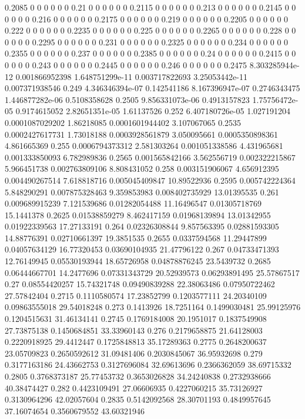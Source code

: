 {0.2085 0 0 0 0 0 0
0.21 0 0 0 0 0 0
0.2115 0 0 0 0 0 0
0.213 0 0 0 0 0 0
0.2145 0 0 0 0 0 0
0.216 0 0 0 0 0 0
0.2175 0 0 0 0 0 0
0.219 0 0 0 0 0 0
0.2205 0 0 0 0 0 0
0.222 0 0 0 0 0 0
0.2235 0 0 0 0 0 0
0.225 0 0 0 0 0 0
0.2265 0 0 0 0 0 0
0.228 0 0 0 0 0 0
0.2295 0 0 0 0 0 0
0.231 0 0 0 0 0 0
0.2325 0 0 0 0 0 0
0.234 0 0 0 0 0 0
0.2355 0 0 0 0 0 0
0.237 0 0 0 0 0 0
0.2385 0 0 0 0 0 0
0.24 0 0 0 0 0 0
0.2415 0 0 0 0 0 0
0.243 0 0 0 0 0 0
0.2445 0 0 0 0 0 0
0.246 0 0 0 0 0 0
0.2475 8.303285944e-12 0.001866952398 1.648751299e-11 0.003717822693 3.25053442e-11 0.007371938546
0.249 4.346346394e-07 0.142541186 8.167396947e-07 0.2746343475 1.446877282e-06 0.5108358628
0.2505 9.856331073e-06 0.4913157823 1.75756472e-05 0.9174615052 2.82651351e-05 1.61137526
0.252 6.407180726e-05 1.027191204 0.0001087029202 1.86218085 0.0001601944402 3.107067065
0.2535 0.0002427617731 1.73018188 0.0003928561879 3.050095661 0.0005350898361 4.861665369
0.255 0.0006794373312 2.581303264 0.001051338586 4.431965681 0.001333850093 6.782989836
0.2565 0.001565842166 3.562556719 0.002322215867 5.966451738 0.002763809106 8.808431052
0.258 0.003151906067 4.656912395 0.004490267514 7.618818716 0.005045409847 10.89522936
0.2595 0.005742224364 5.848290291 0.007875328463 9.359853983 0.008402735929 13.01395535
0.261 0.009689915239 7.121539686 0.01282054488 11.16496547 0.01305718769 15.1441378
0.2625 0.01538859279 8.462417159 0.01968139894 13.01342955 0.01922339563 17.27133191
0.264 0.02326308844 9.857563395 0.02881593305 14.88776391 0.02710661397 19.3851535
0.2655 0.0337594568 11.29447899 0.04057634129 16.77320453 0.03690104935 21.47796122
0.267 0.04733471393 12.76149945 0.05530193944 18.65726958 0.04878876245 23.5439732
0.2685 0.06444667701 14.2477696 0.07331343729 20.52939573 0.06293891495 25.57867517
0.27 0.08554420257 15.74321748 0.09490839288 22.38063486 0.07950722462 27.57842404
0.2715 0.1110580574 17.23852799 0.1203577111 24.20340109 0.09863555018 29.54018248
0.273 0.1413926 18.7251164 0.1499030481 25.99125976 0.1204515631 31.46134141
0.2745 0.1769184008 20.1951017 0.1837549908 27.73875138 0.1450684851 33.33960143
0.276 0.2179658875 21.64128003 0.2220918925 29.4412447 0.1725848813 35.17289363
0.2775 0.2648200637 23.05709823 0.2650592612 31.09481406 0.2030845067 36.95932698
0.279 0.3177163186 24.43662753 0.3127696084 32.69613696 0.2366362059 38.69715332
0.2805 0.3768373187 25.77453732 0.3653026828 34.24240838 0.2732938666 40.38474427
0.282 0.4423109491 27.06606935 0.4227060215 35.73126927 0.3130964296 42.02057604
0.2835 0.5142092568 28.30701193 0.4849957645 37.16074654 0.3560679552 43.60321946
}
